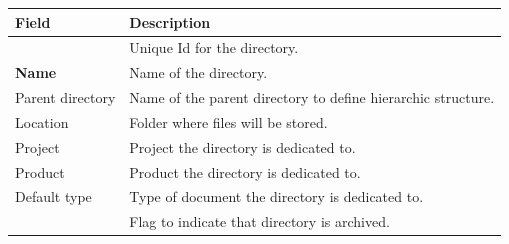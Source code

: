 \documentclass[letterpaper,10pt,english]{sphinxmanual}
\begin{document}
\begin{tabulary}{\linewidth}{|l|l|}
\hline
\textsf{\relax 
Field
} & \textsf{\relax 
Description
}\\
\hline
{\hyperref[Glossary:term-id]{\emph{}}}
 & 
Unique Id for the directory.
\\
\hline
\textbf{Name}
 & 
Name of the directory.
\\
\hline
Parent directory
 & 
Name of the parent directory to define hierarchic structure.
\\
\hline
Location
 & 
Folder where files will be stored.
\\
\hline
Project
 & 
Project the directory is dedicated to.
\\
\hline
Product
 & 
Product the directory is dedicated to.
\\
\hline
Default type
 & 
Type of document the directory is dedicated to.
\\
\hline
{\hyperref[Glossary:term-closed]{\emph{}}}
 & 
Flag to indicate that directory is archived.
\\
\hline\end{tabulary}
\end{document}
